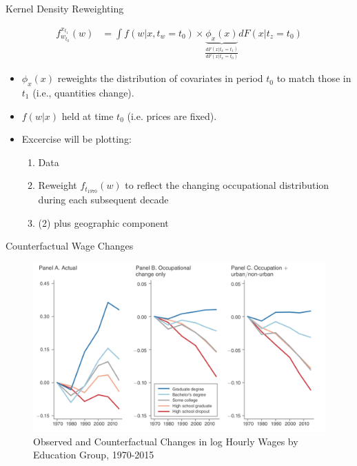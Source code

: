 \documentclass{beamer}
\begin{document}
\begin{frame}{Kernel Density Reweighting}

\begin{align*}
f_{w_{t_0}}^{x_{t_1}}(w) &= \int f(w| x, t_{w} = t_0) \times \underbrace{\phi_x(x)}_{\frac{dF(x|t_x=t_1)}{dF(x|t_x=t_0)}}dF(x | t_z = t_0)
\end{align*}

\begin{itemize}
	 
	\item $\phi_x(x)$ reweights the
	distribution of covariates in period $t_0$ to match those in $t_1$ (i.e., quantities change).
	
	\bigskip
	
	\item $f(w|x)$ held at time $t_0$ (i.e. prices are fixed).
	
	\bigskip
	
	\item Excercise will be plotting:
	\begin{enumerate}
		\item Data
		\item Reweight $f_{t_{1970}}(w)$ to reflect the changing occupational distribution during each subsequent decade
		\item (2) plus geographic component
	\end{enumerate}
	
\end{itemize}

\end{frame}


\begin{frame}{Counterfactual Wage Changes}

\begin{figure}
	\begin{center}
		\includegraphics[scale=0.4]{Figures/Fig11_counterfactualWageChange}
		\caption{Observed and Counterfactual Changes in log Hourly Wages by Education Group, 1970-2015}
	\end{center}
\end{figure}

\end{frame}
\end{document}
